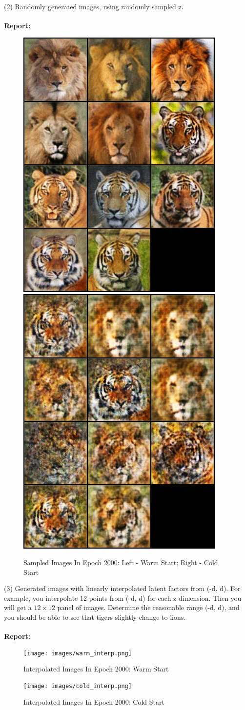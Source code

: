 \documentclass[11pt]{article}
\begin{document}
(2) Randomly generated images, using randomly sampled z.
\\~\\
\textbf{Report:}
\begin{figure}
    \centering
    \includegraphics[width=.35\linewidth]{images/warm_sampled.png}
    \includegraphics[width=.35\linewidth]{images/cold_sampled.png}
    \caption{Sampled Images In Epoch 2000: Left - Warm Start; Right - Cold Start}
\end{figure}

(3) Generated images with linearly interpolated latent factors from (-d, d).
For example, you interpolate 12 points from (-d, d) for each z dimension. Then you
will get a $12 \times 12$ panel of images. Determine the reasonable range (-d, d), and you should be able to see that tigers slightly change to lions.
\\~\\
\textbf{Report:}
\begin{figure}
    \centering
    \texttt{[image: images/warm\_interp.png]}
    \caption{Interpolated Images In Epoch 2000: Warm Start}
\end{figure}

\begin{figure}
    \centering
    \texttt{[image: images/cold\_interp.png]}
    \caption{Interpolated Images In Epoch 2000: Cold Start}
\end{figure}
\end{document}
